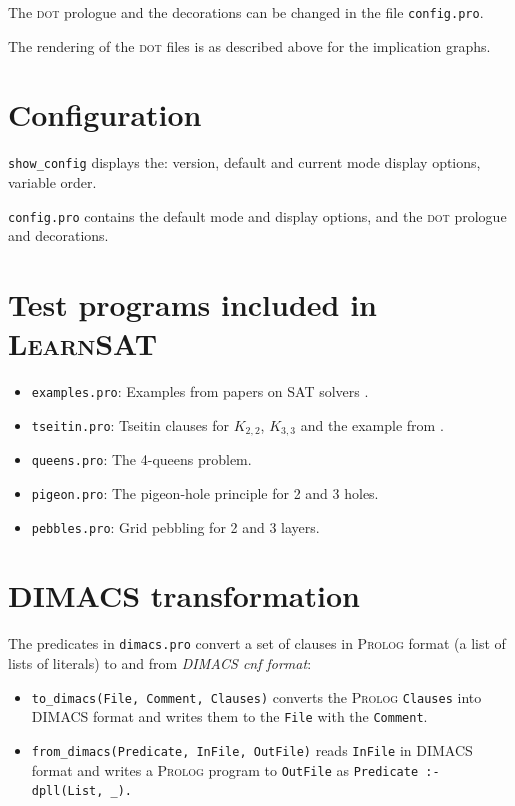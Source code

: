 \documentclass[11pt]{article}
\newcommand*{\p}[1]{\textup{\texttt{#1}}}
\newcommand*{\ls}{\textsc{LearnSAT}}
\newcommand*{\pl}{\textsc{Prolog}}
\newcommand*{\dt}{\textsc{dot}}
\begin{document}
The \dt{} prologue and the decorations can be changed in the file
\p{config.pro}.

The rendering of the \dt{} files is as described above for the
implication graphs.


\newpage

\section{Configuration}

\p{show\_config} displays the: version, default and current mode
display options, variable order.

\p{config.pro} contains the default mode and
display options, and the \dt{} prologue and decorations.



\section{Test programs included in \ls{}}

\begin{itemize}
\item \p{examples.pro}: Examples from papers on SAT
solvers \cite{mz,mlm,ms}.

\item \p{tseitin.pro}: Tseitin clauses for $K_{2,2}$,
$K_{3,3}$ and the example from \cite[Section 4.5]{mlcs}.

\item \p{queens.pro}: The 4-queens problem.

\item \p{pigeon.pro}: The pigeon-hole principle for 2 and 3 holes.

\item \p{pebbles.pro}: Grid pebbling for 2 and 3 layers.
\end{itemize}

\section{DIMACS transformation}

The predicates in \p{dimacs.pro} convert a set of clauses in
\pl{} format (a list of lists of literals) to and from \emph{DIMACS cnf
format}:
\begin{itemize}
\item \p{to\_dimacs(File, Comment, Clauses)} converts the \pl{}
\p{Clauses} into DIMACS format and writes them to the \p{File} with the
\p{Comment}.
\item \p{from\_dimacs(Predicate, InFile, OutFile)} reads \p{InFile} in
DIMACS format and writes a \pl{} program to \p{OutFile} as
\verb+Predicate :- dpll(List, _).+
\end{itemize}
\end{document}
